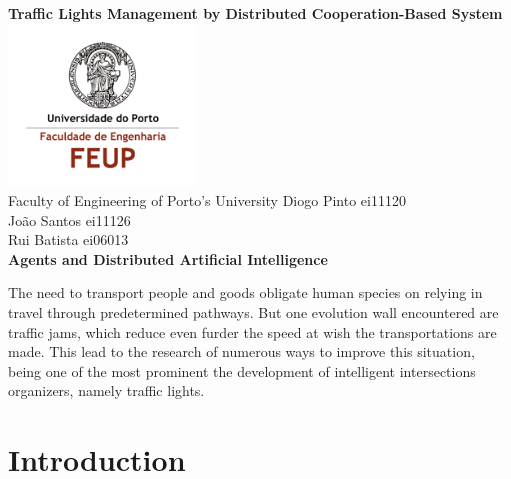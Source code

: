 \documentclass[10pt,a4paper]{article}
\begin{document}
\chead{}


\begin{titlepage}
    \centering
    {\bfseries\Large
        Traffic Lights Management by Distributed Cooperation-Based System\\   
    }
    \vfill
    \vfill
	\includegraphics[width=5cm]{feup_logo.png}\\
	Faculty of Engineering of Porto's University
    \vfill
    \vfill
    \centering
     Diogo Pinto      ei11120\\
     João Santos      ei11126\\
     Rui Batista      ei06013\\
    \vfill
   {\bfseries\Large  Agents and Distributed Artificial Intelligence\\
   }
    \vfill
    \vfill
    \vfill
\end{titlepage}

\newpage

\tableofcontents
\newpage

\begin{abstract}

\end{abstract}
The need to transport people and goods obligate human species on relying in travel through predetermined pathways. But one evolution wall encountered are traffic jams, which reduce even furder the speed at wish the transportations are made. This lead to the research of numerous ways to improve this situation, being one of the most prominent the development of intelligent intersections organizers, namely traffic lights.

\newpage

\section{Introduction}
\end{document}

